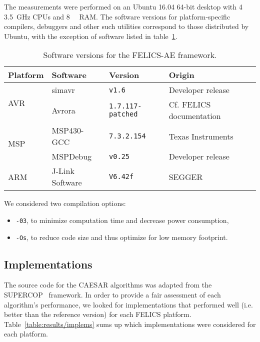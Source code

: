 \documentclass{article}
\begin{document}
The measurements were performed on an Ubuntu 16.04 64-bit desktop with
4 \SI{3.5}{\GHz} CPUs and \SI{8}{\giga \byte} RAM.  The software
versions for platform-specific compilers, debuggers and other such
utilities correspond to those distributed by Ubuntu, with the
exception of software listed in table~\ref{table:results/setup}.

\begin{table}[H]
  \centering
  \begin{tabular}{l|l|l|l}
    \textbf{Platform} & \textbf{Software} & \textbf{Version}         & \textbf{Origin}                               \\
    \hline
    \multirow{2}{*}{AVR}
                      & simavr            & \texttt{v1.6}            & Developer release~\cite{FELICS:simavr}        \\
                      & Avrora            & \texttt{1.7.117-patched} & Cf. FELICS documentation~\cite{FELICS:avrora} \\
    \hline
    \multirow{2}{*}{MSP}
                      & MSP430-GCC        & \texttt{7.3.2.154}       & Texas Instruments~\cite{FELICS:msp430-gcc}    \\
                      & MSPDebug          & \texttt{v0.25}           & Developer release~\cite{FELICS:mspdebug}      \\
    \hline
    \multirow{1}{*}{ARM}
                      & J-Link Software   & \texttt{V6.42f}          & SEGGER~\cite{FELICS:jlink-soft}               \\
    \hline
  \end{tabular}
  \caption{Software versions for the FELICS-AE framework.}
  \label{table:results/setup}
\end{table}

We considered two compilation options:

\begin{itemize}
\item \texttt{-03}, to minimize computation time and decrease power
  consumption,
\item \texttt{-Os}, to reduce code size and thus optimize for low
  memory footprint.
\end{itemize}

\subsection{Implementations}
\label{sec:results/implementations}

The source code for the CAESAR algorithms was adapted from the
SUPERCOP~\cite{CAESAR:SUPERCOP} framework.  In order to provide a fair
assessment of each algorithm's performance, we looked for
implementations that performed well (i.e. better than the reference
version) for each FELICS platform.  Table~\ref{table:results/implems}
sums up which implementations were considered for each platform.
\end{document}

